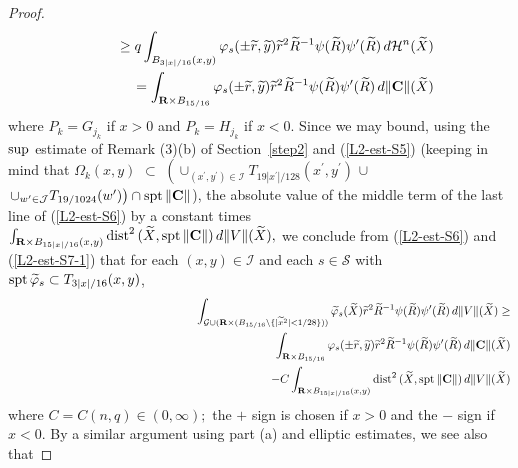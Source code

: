 \documentclass[a4paper,11pt]{amsart}
\begin{document}
\begin{proof}
\begin{eqnarray}
&&\hspace{.2in}\geq q\int_{B_{3|x|/16}(x,y)}\varphi_{s}(\pm\widetilde{r},\widetilde{y})\widetilde{r}^{2}\widetilde{R}^{-1}\psi(\widetilde{R})\psi^{\prime}(\widetilde{R}) \, d{\mathcal H}^{n}(\widetilde{X})\nonumber\\
&&\hspace{.2in}=\int_{{\mathbf R} \times B_{15/16}}\varphi_{s}(\pm\widetilde{r},\widetilde{y})\widetilde{r}^{2}\widetilde{R}^{-1}\psi(\widetilde{R})\psi^{\prime}(\widetilde{R}) \, d\|{\mathbf C}\|(\widetilde{X})
\end{eqnarray}
where $P_{k} = G_{j_{k}}$ if $x > 0$ and $P_{k} = H_{j_{k}}$ if $x < 0$. Since we may bound, using the ${\rm sup}$ estimate of Remark (3)(b) of Section~\ref{step2} and (\ref{L2-est-S5}) (keeping in mind that 
$\Omega_{k}(x,y)$ $\subset$ $\left(\cup_{(x^{\prime}, y^{\prime}) \in {\mathcal I}}T_{19|x^{\prime}|/128}(x^{\prime}, y^{\prime})\right.$ $\cup$ $\left.\cup_{w^{\prime} \in {\mathcal J}}T_{19/1024}(w^{\prime})\right) \cap {\rm spt} \, \|{\mathbf C}\|$), the absolute value of the middle term of the last line of (\ref{L2-est-S6}) by a constant times $\int_{{\mathbf R} \times B_{15|x|/16}(x,y)}{\rm dist}^{2} \, (\widetilde{X}, {\rm spt}\,\|{\mathbf C}\|) \, d\|V\|(\widetilde{X}),$ 
we conclude from (\ref{L2-est-S6}) and (\ref{L2-est-S7-1}) that for each $(x,y) \in {\mathcal I}$ and each $s \in {\mathcal S}$ with 
${\rm spt} \, \widetilde{\varphi}_{s} \subset T_{3|x|/16}(x,y)$,
\begin{eqnarray}\label{L2-est-S8}
&&\hspace{-.2in}\int_{\mathcal G \cup ({\mathbf R} \times (B_{15/16} \setminus \{|\widetilde{x}^{2}| < 1/28\}))}\widetilde{\varphi}_{s}(\widetilde{X})\widetilde{r}^{2}\widetilde{R}^{-1}\psi(\widetilde{R})\psi^{\prime}(\widetilde{R}) \, d\|V\|(\widetilde{X}) \geq\nonumber\\
&&\hspace{1.5in}\int_{{\mathbf R} \times B_{15/16}}\varphi_{s}(\pm\widetilde{r},\widetilde{y})\widetilde{r}^{2}\widetilde{R}^{-1}\psi(\widetilde{R})\psi^{\prime}(\widetilde{R}) \, d\|{\mathbf C}\|(\widetilde{X})\nonumber\\
&&\hspace{3in} - C\int_{{\mathbf R} \times B_{15|x|/16}(x,y)}{\rm dist}^{2} \, (\widetilde{X}, {\rm spt}\,\|{\mathbf C}\|) \, d\|V\|(\widetilde{X})
\end{eqnarray}
where $C = C(n, q) \in (0, \infty);$ the $+$ sign is chosen if $x > 0$ and the $-$ sign if $x < 0.$ By a similar argument using part (a) and elliptic estimates, we see also that

\end{proof}
\end{document}
